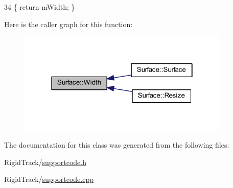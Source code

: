 \begin{DoxyCode}
34 \{ \textcolor{keywordflow}{return} mWidth;  \}
\end{DoxyCode}
Here is the caller graph for this function\+:\nopagebreak
\begin{figure}[H]
\begin{center}
\leavevmode
\includegraphics[width=286pt]{class_surface_ae76d7c2fa208df6979a77cc60e8105c0_icgraph}
\end{center}
\end{figure}


The documentation for this class was generated from the following files\+:\begin{DoxyCompactItemize}
\item 
Rigid\+Track/\hyperlink{supportcode_8h}{supportcode.\+h}\item 
Rigid\+Track/\hyperlink{supportcode_8cpp}{supportcode.\+cpp}\end{DoxyCompactItemize}
